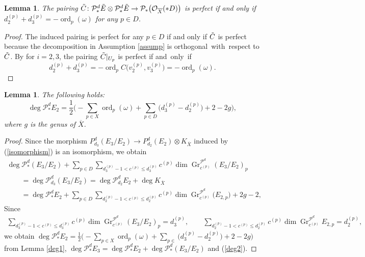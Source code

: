 \documentclass[10pt,a4paper]{amsart}
\numberwithin{equation}{section}
\newtheorem{Lemma}[Theorem]{Lemma}
\newcommand{\ord}{\operatorname{ord}}
\newcommand{\gr}{\operatorname{\mathrm{Gr}}}
\begin{document}
\begin{Lemma}\label{perfect}
 The pairing $\Tilde{C}\colon \mathcal{P}^d_* \Tilde{E}\otimes \mathcal{P}^d_* \Tilde{E}\to \mathcal{P}_*\bigl(\mathcal{O}_{\overline{X}}(*D)\bigr)$ is perfect if and only if $d^{(p)}_2 + d^{(p)}_3 = -\ord_p(\omega)$ for any $p\in D$.
\end{Lemma}
\begin{proof}
 The induced pairing  is perfect for any ${p\in D}$ if and only if $\Tilde{C}$ is perfect because the decomposition in Assumption \ref{assump} is orthogonal~with~respect to $\Tilde{C}$. By  for $i=2,3$, the pairing $\Tilde{C}|_{U_p}$ is perfect if and~only~if%
\begin{equation*}
 d^{(p)}_2 + d^{(p)}_3 = -\ord_p C\bigl(v^{(p)}_2,v^{(p)}_3\bigr) = -\ord_p(\omega).\tag*{\qed}
 \end{equation*}
 \renewcommand{\qed}{}
\end{proof}

\begin{Lemma}\label{deg_E2}
 The following holds:
 \begin{equation*}
 \deg{\mathcal{P}^d_{*}E_2} = \frac{1}{2}\biggl(-\sum_{p\in X}\ord_p(\omega) + \sum_{p\in D} \bigl(d^{(p)}_3 - d^{(p)}_2\bigr) + 2-2g\biggr),
 \end{equation*}
where $g$ is the genus of $\overline{X}$.
\end{Lemma}
\begin{proof}
 Since the morphism ${P}^d_{d_3}(E_3/E_2)\to {P}^d_{d_2}(E_2)\otimes K_{\overline{X}}$ induced by (\ref{isomorphism}) is an isomorphism, we obtain
\begin{gather}
 \deg{\mathcal{P}^d_{*}(E_3/E_2)} + \sum_{p\in D}\sum_{d^{(p)}_{3}-1< c^{(p)}\leq d^{(p)}_{3}} c^{(p)} \dim \gr^{\mathcal{P}^d}_{c^{(p)}} (E_3/E_2)_{p} \nonumber\\
 \qquad{}= \deg{\mathcal{P}^d_{d_3}(E_3/E_2)} = \deg{\mathcal{P}^d_{d_2}E_2} + \deg{K_{\overline{X}}} \nonumber\\
 \qquad{}= \deg{\mathcal{P}^d_{*}E_2} + \sum_{p\in D}\sum_{d^{(p)}_{2}-1< c^{(p)}\leq d^{(p)}_{2}} c^{(p)} \dim \gr^{\mathcal{P}^d}_{c^{(p)}} \bigl(E_{2,p}\bigr) + 2g -2,\label{deg2}
\end{gather}
 Since
\begin{gather*}
 \sum_{d^{(p)}_{3}-1< c^{(p)}\leq d^{(p)}_{3}} c^{(p)} \dim \gr^{\mathcal{P}^d}_{c^{(p)}} (E_3/E_2)_{p} = d^{(p)}_3, \qquad
 \sum_{d^{(p)}_{2}-1< c^{(p)}\leq d^{(p)}_{2}} c^{(p)} \dim \gr^{\mathcal{P}^d}_{c^{(p)}} E_{2,p} = d^{(p)}_2,
\end{gather*}
we obtain $\deg{\mathcal{P}^d_{*}E_2} = \frac{1}{2}\bigl(-\sum_{p\in X}\ord_p(\omega) + \sum_{p\in} \bigl(d^{(p)}_3 - d^{(p)}_2\bigr) + 2-2g\bigr)$ from Lemma \ref{deg1}, ${\deg{\mathcal{P}^{d}_*E_3} = \deg{\mathcal{P}^{d}_*E_2} + \deg{\mathcal{P}^{d}_*(E_3/E_2)}}$ and (\ref{deg2}).
\end{proof}
\end{document}

